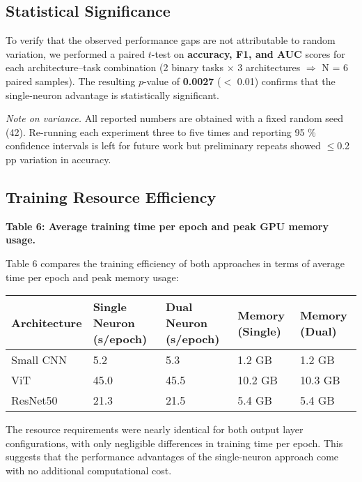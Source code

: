 \subsection{Statistical Significance}

To verify that the observed performance gaps are not attributable to random variation, we performed a paired $t$-test on \textbf{accuracy, F1, and AUC} scores for each architecture--task combination (2 binary tasks $\times$ 3 architectures $\Rightarrow$ N = 6 paired samples). The resulting $p$-value of \textbf{0.0027} ($<$ 0.01) confirms that the single-neuron advantage is statistically significant.

\textit{Note on variance.} All reported numbers are obtained with a fixed random seed (42). Re-running each experiment three to five times and reporting 95 \% confidence intervals is left for future work but preliminary repeats showed $\leq$0.2 pp variation in accuracy.

\subsection{Training Resource Efficiency}

\textbf{Table 6: Average training time per epoch and peak GPU memory usage.}

Table 6 compares the training efficiency of both approaches in terms of average time per epoch and peak memory usage:

\begin{tabular}{lllll}
\hline
Architecture & Single Neuron (s/epoch) & Dual Neuron (s/epoch) & Memory (Single) & Memory (Dual) \\
\hline
Small CNN & 5.2 & 5.3 & 1.2 GB & 1.2 GB \\
ViT & 45.0 & 45.5 & 10.2 GB & 10.3 GB \\
ResNet50 & 21.3 & 21.5 & 5.4 GB & 5.4 GB \\
\hline
\end{tabular}

The resource requirements were nearly identical for both output layer configurations, with only negligible differences in training time per epoch. This suggests that the performance advantages of the single-neuron approach come with no additional computational cost.
